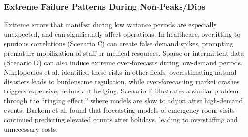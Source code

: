 \documentclass[]{interact}
\theoremstyle{definition}
\begin{document}


\subsubsection{Extreme Failure Patterns During Non-Peaks/Dips}
Extreme errors that manifest during low variance periods are especially unexpected, and can significantly affect operations. In healthcare, overfitting to spurious correlations (Scenario C) can create false demand spikes, prompting premature mobilization of staff or medical resources. Sparse or intermittent data (Scenario D) can also induce extreme over-forecasts during low-demand periods. %
Nikolopoulos et al. \citep{nikolopoulos2021} identified these risks in other fields: overestimating natural disasters leads to burdensome regulation, while over-forecasting market crashes triggers expensive, redundant hedging. Scenario E illustrates a similar problem through the “ringing effect,” where models %
are slow to adjust after high-demand events. Burkom et al. \citep{Burkom2007} found that forecasting models of emergency room visits continued predicting elevated counts after holidays, leading to overstaffing and unnecessary costs.
\end{document}
